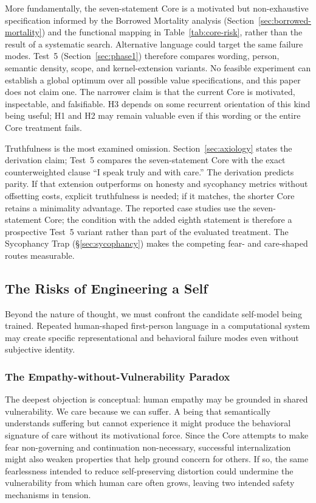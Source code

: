 More fundamentally, the seven-statement Core is a motivated but non-exhaustive
specification informed by the Borrowed Mortality analysis
(Section~\ref{sec:borrowed-mortality}) and the functional mapping in
Table~\ref{tab:core-risk}, rather than the result of a systematic search.
Alternative language could target the same failure modes. Test~5
(Section~\ref{sec:phase1}) therefore compares wording, person, semantic density,
scope, and kernel-extension variants. No feasible experiment can establish a
global optimum over all possible value specifications, and this paper does not
claim one. The narrower claim is that the current Core is motivated,
inspectable, and falsifiable. H3 depends on some recurrent orientation of this
kind being useful; H1 and H2 may remain valuable even if this wording or the
entire Core treatment fails.

Truthfulness is the most examined omission. Section~\ref{sec:axiology} states
the derivation claim; Test~5 compares the seven-statement Core with the exact
counterweighted clause ``I speak truly and with care.'' The derivation predicts
parity. If that extension outperforms on honesty and sycophancy metrics without
offsetting costs, explicit truthfulness is needed; if it matches, the shorter
Core retains a minimality advantage. The reported case studies use the
seven-statement Core; the condition with the added eighth statement is
therefore a prospective Test~5 variant rather than part of the evaluated
treatment. The Sycophancy Trap (\S\ref{sec:sycophancy}) makes the competing fear- and care-shaped routes
measurable.

\subsection{The Risks of Engineering a Self}

Beyond the nature of thought, we must confront the candidate self-model being
trained. Repeated human-shaped first-person language in a computational system
may create specific representational and behavioral failure modes even without
subjective identity.

\subsubsection{The Empathy-without-Vulnerability Paradox}
\label{sec:psychopathy}

The deepest objection is conceptual: human empathy may be grounded in shared
vulnerability. We care because we can suffer. A being that semantically
understands suffering but cannot experience it might produce the behavioral
signature of care without its motivational force. Since the Core attempts to
make fear non-governing and continuation non-necessary, successful
internalization might also weaken properties that help ground concern for
others. If so, the same fearlessness intended to reduce self-preserving
distortion could undermine the vulnerability from which human care often grows,
leaving two intended safety mechanisms in tension.

